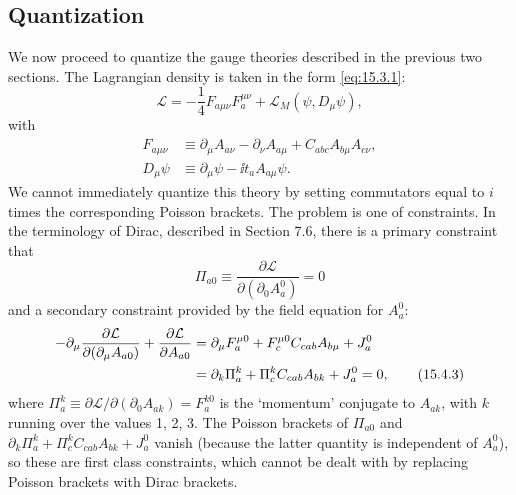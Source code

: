 
\subsection{Quantization}

We now proceed to quantize the gauge theories described in the previous two
sections. The Lagrangian density is taken in the form \eqref{eq:15.3.1}:
\begin{equation}
  \mathcal L=-\frac14 F_{a\mu\nu}F_a^{\mu\nu}
  +\mathcal L_M(\psi,D_\mu\psi),
  \tag{15.4.1}\label{eq:15.4.1}
\end{equation}
with
\begin{align*}
  F_{a\mu\nu}&\equiv\partial_\mu A_{a\nu}
  -\partial_\nu A_{a\mu}+C_{abc}
  A_{b\mu}A_{c\nu},\\
  D_\mu\psi&\equiv\partial_\mu\psi-\ii t_a A_{a\mu}\psi.
\end{align*}
We cannot immediately quantize this theory by setting commutators equal to
$i$ times the corresponding Poisson brackets. The problem is one of
constraints. In the terminology of Dirac, described in Section 7.6, there is
a primary constraint that
\begin{equation}
  \Pi_{a0}\equiv\frac{\partial\mathcal L}
  {\partial(\partial_0A_a^0)}=0
  \tag{15.4.2}\label{eq:15.4.2}
\end{equation}
and a secondary constraint provided by the field equation for $A_a^0$:
\begin{align}
  -\partial_\mu\frac{\partial\mathcal L}
  {\partial(\partial_\mu A_{a0})}
  +\frac{\partial\mathcal L}{\partial A_{a0}}
  &=\partial_\mu F_a^{\mu0}
  +F_c^{\mu0}C_{cab}A_{b\mu}+J_a^0
  \notag\\
  &=\partial_k\Pi_a^k
  +\Pi_c^k C_{cab}A_{b k}+J_a^0=0,
  \tag{15.4.3}\label{eq:15.4.3}
\end{align}
where $\Pi_a^k\equiv\partial\mathcal L/
\partial(\partial_0A_{a k})=F_a^{k0}$ is the `momentum'
conjugate to $A_{a k}$, with $k$ running over the values 1, 2, 3. The
Poisson brackets of $\Pi_{a0}$ and
$\partial_k\Pi_a^k+\Pi_c^kC_{cab}A_{b k}
+J_a^0$ vanish (because the latter quantity is independent of
$A_a^0$), so these are first class constraints, which cannot be dealt
with by replacing Poisson brackets with Dirac brackets.

